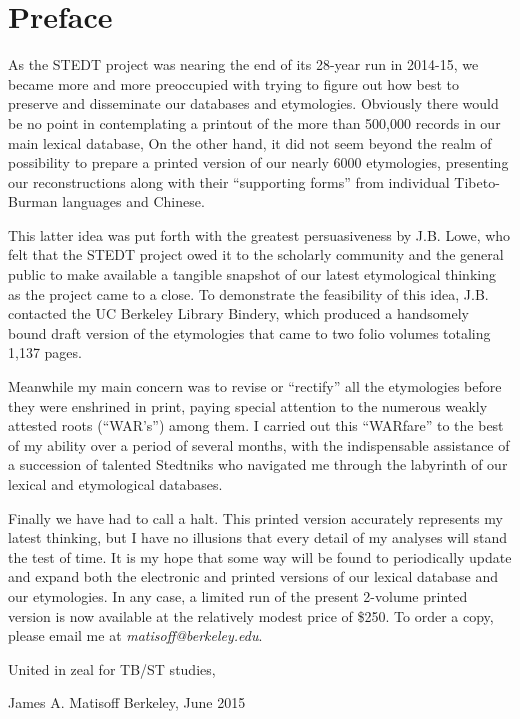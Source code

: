 \vspace{0.25em}

\renewcommand{\thefootnote}{\arabic{footnote}}
\setcounter{footnote}{0}

\chapter*{Preface}

As the STEDT project was nearing the end of its 28-year run in
2014-15, we became more and more preoccupied with trying to figure out
how best to preserve and disseminate our databases and etymologies.
Obviously there would be no point in contemplating a printout of the
more than 500,000 records in our main lexical database, On the other
hand, it did not seem beyond the realm of possibility to prepare a
printed version of our nearly 6000 etymologies, presenting our
reconstructions along with their “supporting forms” from individual Tibeto-Burman languages and Chinese.

This latter idea was put forth with the greatest persuasiveness by
J.B. Lowe, who felt that the STEDT project owed it to the scholarly
community and the general public to make available a tangible snapshot
of our latest etymological thinking as the project came to a close. To
demonstrate the feasibility of this idea, J.B. contacted the UC
Berkeley Library Bindery, which produced a handsomely bound draft
version of the etymologies that came to two folio volumes totaling 1,137 pages.

Meanwhile my main concern was to revise or “rectify” all the
etymologies before they were enshrined in print, paying special
attention to the numerous weakly attested roots (“WAR’s”) among them.
I carried out this “WARfare” to the best of my ability over a period
of several months,
with the indispensable assistance of a succession of talented Stedtniks
who navigated me through the labyrinth of our lexical and etymological databases.

Finally we have had to call a halt. This printed version accurately
represents my latest thinking, but I have no illusions that every
detail of my analyses will stand the test of time. It is my hope that
some way will be found to periodically update and expand both the
electronic and printed versions of our lexical database and our
etymologies. In any case, a limited run of the present 2-volume
printed version is now available at the relatively modest price of
\$250. To order a copy, please email me at {\it matisoff@berkeley.edu}.

						United in zeal for TB/ST studies,

						James A. Matisoff
						Berkeley, June 2015
